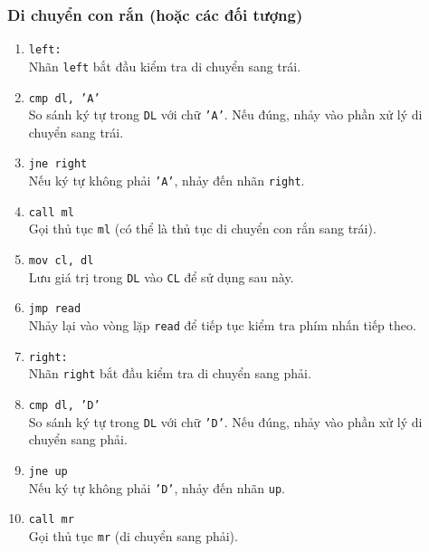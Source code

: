\documentclass[12pt]{article}
\begin{document}
\subsubsection*{Di chuyển con rắn (hoặc các đối tượng)}
\begin{enumerate}[label=\textbf{\arabic*.}]
    \item \texttt{left:} \\
    Nhãn \texttt{left} bắt đầu kiểm tra di chuyển sang trái.
    
    \item \texttt{cmp dl, 'A'} \\
    So sánh ký tự trong \texttt{DL} với chữ \texttt{'A'}. Nếu đúng, nhảy vào phần xử lý di chuyển sang trái.
    
    \item \texttt{jne right} \\
    Nếu ký tự không phải \texttt{'A'}, nhảy đến nhãn \texttt{right}.
    
    \item \texttt{call ml} \\
    Gọi thủ tục \texttt{ml} (có thể là thủ tục di chuyển con rắn sang trái).
    
    \item \texttt{mov cl, dl} \\
    Lưu giá trị trong \texttt{DL} vào \texttt{CL} để sử dụng sau này.
    
    \item \texttt{jmp read} \\
    Nhảy lại vào vòng lặp \texttt{read} để tiếp tục kiểm tra phím nhấn tiếp theo.

    \item \texttt{right:} \\
    Nhãn \texttt{right} bắt đầu kiểm tra di chuyển sang phải.
    
    \item \texttt{cmp dl, 'D'} \\
    So sánh ký tự trong \texttt{DL} với chữ \texttt{'D'}. Nếu đúng, nhảy vào phần xử lý di chuyển sang phải.
    
    \item \texttt{jne up} \\
    Nếu ký tự không phải \texttt{'D'}, nhảy đến nhãn \texttt{up}.
    
    \item \texttt{call mr} \\
    Gọi thủ tục \texttt{mr} (di chuyển sang phải).
    

\end{enumerate}
\end{document}
